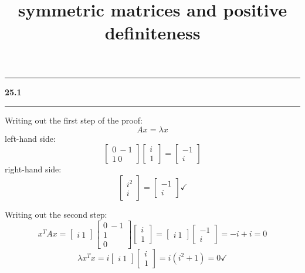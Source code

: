 \documentclass[11pt]{article}
\newcommand\question[2]{\vspace{.25in}\hrule\textbf{#1 #2}\vspace{.5em}\hrule\vspace{.10in}}
\begin{document}
\raggedright
\newcommand\NAME{Haiying Cui}  %
\newcommand\ANDREWID{Christy}     %
\newcommand\HWNUM{25}              %

\title{symmetric matrices and positive definiteness}
\maketitle

\question{25.1}{}
Writing out the first step of the proof:
$$Ax = \lambda x$$
left-hand side:$$\begin{bmatrix} 0 \ -1 \\ 1 \ 0 \end{bmatrix}\begin{bmatrix} i \\ 1 \end{bmatrix} = \begin{bmatrix} -1 \\ i \end{bmatrix}$$
right-hand side:
$$\begin{bmatrix} i^2 \\ i \end{bmatrix} = \begin{bmatrix} -1 \\ i \end{bmatrix} \checkmark$$

Writing out the second step:
$$x^TAx = \begin{bmatrix} i \ 1 \end{bmatrix}\begin{bmatrix} 0 \ -1 \\ 1 \\ 0 \end{bmatrix}\begin{bmatrix} i \\ 1 \end{bmatrix} = \begin{bmatrix} i \ 1 \end{bmatrix}\begin{bmatrix} -1 \\ i \end{bmatrix} = -i+i = 0$$
$$\lambda x^Tx = i\begin{bmatrix} i \ 1 \end{bmatrix}\begin{bmatrix} i \\ 1 \end{bmatrix} = i(i^2 + 1) =0 \checkmark $$
\end{document}
